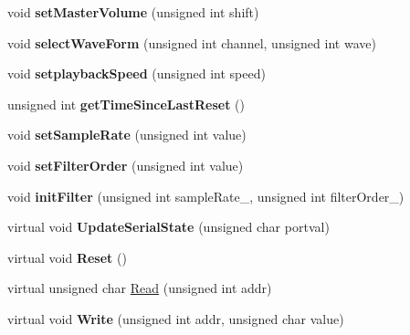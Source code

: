 \begin{DoxyCompactItemize}
\item 
\mbox{\label{class_t_e_d_abb9b2cafe5ccf6a53882908ccc044366}} 
void {\bfseries set\+Master\+Volume} (unsigned int shift)
\item 
\mbox{\label{class_t_e_d_a44800d2bf26bff7492f609d231a61c47}} 
void {\bfseries select\+Wave\+Form} (unsigned int channel, unsigned int wave)
\item 
\mbox{\label{class_t_e_d_a494d1f807156122a0e9e3522d846a497}} 
void {\bfseries setplayback\+Speed} (unsigned int speed)
\item 
\mbox{\label{class_t_e_d_ad2d01439e304042d6451281d94d72e1e}} 
unsigned int {\bfseries get\+Time\+Since\+Last\+Reset} ()
\item 
\mbox{\label{class_t_e_d_a208505f277f4bb5820c6f82b0122a626}} 
void {\bfseries set\+Sample\+Rate} (unsigned int value)
\item 
\mbox{\label{class_t_e_d_a2907986d292ea4b15d918846c0bb94ac}} 
void {\bfseries set\+Filter\+Order} (unsigned int value)
\item 
\mbox{\label{class_t_e_d_a8ba4e20af70bdf0e8849bdb0efeb9255}} 
void {\bfseries init\+Filter} (unsigned int sample\+Rate\+\_\+, unsigned int filter\+Order\+\_\+)
\item 
\mbox{\label{class_t_e_d_afec8864192337e4762d1197bbafb0ff1}} 
virtual void {\bfseries Update\+Serial\+State} (unsigned char portval)
\item 
\mbox{\label{class_t_e_d_acc0d5c1274fd60cfa2c75907fc721bae}} 
virtual void {\bfseries Reset} ()
\item 
virtual unsigned char \mbox{\hyperlink{class_t_e_d_a15d3c4cf86452dc0599d6dd504fa832f}{Read}} (unsigned int addr)
\item 
\mbox{\label{class_t_e_d_aa9ec07973a4bffc506ffe46973de09eb}} 
virtual void {\bfseries Write} (unsigned int addr, unsigned char value)
\item 
\mbox{\label{class_t_e_d_a041d56e600f621990417ff7623a2a31a}} 

\end{DoxyCompactItemize}
